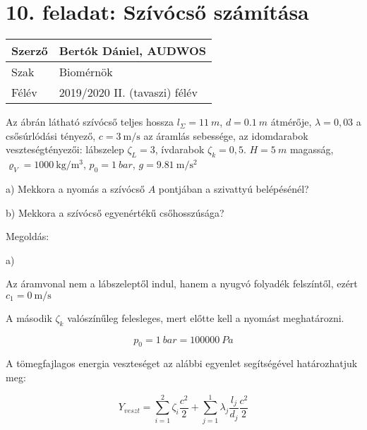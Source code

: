 \section*{10. feladat: Szívócső számítása}




\begin{tabular}{ | p{2cm} | p{14cm} | } 
	\hline
	Szerző & Bertók Dániel, AUDWOS \\ 
	\hline
	Szak & Biomérnök \\ 
	\hline
	Félév & 2019/2020 II. (tavaszi) félév \\ 
	\hline
\end{tabular}
\vspace{0.5cm}


\noindent Az ábrán látható szívócső teljes hossza $l_\Sigma= \SI{11}{m}$,
$d= \SI{0,1}{m}$ átmérője,
$\lambda= 0,03$ a csősúrlódási tényező,
$c= \SI{3}{\meter\per\second}$ az áramlás sebessége,
az idomdarabok veszteségtényezői:
lábszelep $\zeta_L= 3$, ívdarabok $\zeta_k= 0,5$.
$H= \SI{5}{m}$ magasság,
$\varrho_V= \SI{1000}{\kilogram\per\meter\cubed}$,
$p_0= \SI{1}{bar}$,
$g= \SI{9,81}{\meter\per\second\squared}$ 

\noindent a) Mekkora a nyomás a szívócső $A$ pontjában a szivattyú belépésénél?

\noindent b) Mekkora a szívócső egyenértékű csőhosszúsága?



\noindent\hrulefill


\noindent Megoldás:

\noindent a)

\noindent Az áramvonal nem a lábszeleptől indul, hanem a nyugvó folyadék felszíntől, ezért $c_1= \SI{0}{\meter\per\second}$

\noindent A második  $\zeta_k$ valószínűleg felesleges, mert előtte kell a nyomást meghatározni.

\begin{equation}
p_0=\SI{1}{bar}=\SI{100000}{Pa}
\end{equation}

A tömegfajlagos energia veszteséget az alábbi egyenlet segítségével határozhatjuk meg:

\begin{equation}
Y_{veszt}=\sum_{i=1}^2\zeta_i{\frac{c^2}{2}}+\sum_{j=1}^1\lambda_j{\frac{l_j}{d_j}}{\frac{c^2}{2}}
\end{equation}

